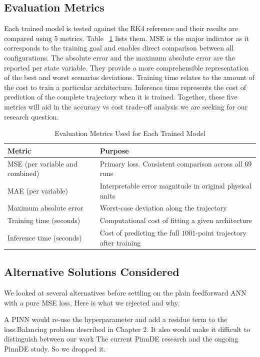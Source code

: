 \subsection{Evaluation Metrics}

Each trained model is tested against the RK4 reference and their results are compared using 5 metrics. Table ~\ref{tab:metrics} lists them. MSE is the major indicator as it corresponds to the training goal and enables direct comparison between all configurations. The absolute error and the maximum absolute error are the reported per state variable. They provide a more comprehensible representation of the best and worst scenarios deviations. Training time relates to the amount of the cost to train a particular architecture. Inference time represents the cost of prediction of the complete trajectory when it is trained. Together, these five metrics will aid in the accuracy vs cost trade-off analysis we are seeking for our research question.

\begin{table}[H]
\centering
\caption{Evaluation Metrics Used for Each Trained Model}
\label{tab:metrics}
\renewcommand{\arraystretch}{1.2}
\begin{tabular}{|l|p{9.5cm}|}
\hline
\textbf{Metric} & \textbf{Purpose} \\
\hline
MSE (per variable and combined) & Primary loss. Consistent comparison across all $69$ runs \\
\hline
MAE (per variable) & Interpretable error magnitude in original physical units \\
\hline
Maximum absolute error & Worst-case deviation along the trajectory \\
\hline
Training time (seconds) & Computational cost of fitting a given architecture \\
\hline
Inference time (seconds) & Cost of predicting the full $1001$-point trajectory after training \\
\hline
\end{tabular}
\end{table}

\subsection{Alternative Solutions Considered}

We looked at several alternatives before settling on the plain feedforward ANN with a pure MSE loss. Here is what we rejected and why.

A PINN would re-use the hyperparameter and add a residue term to the loss.Balancing problem described in Chapter 2. It also would make it difficult to distinguish between our work The current PinnDE research and the ongoing PinnDE study. So we dropped it.

